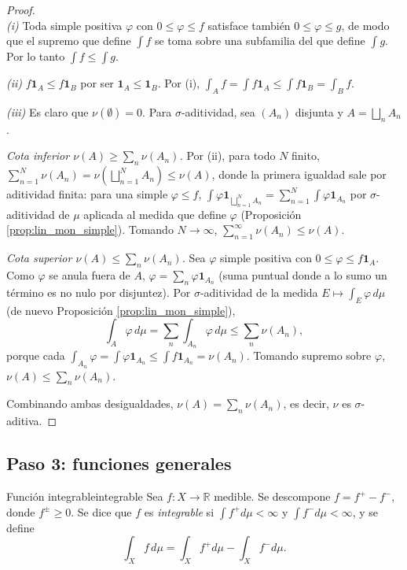 \documentclass[11pt, a4paper]{article}
\begin{document}
\begin{proof}\leavevmode\\
\textit{(i)} Toda simple positiva $\varphi$ con $0 \le \varphi \le f$ satisface también
$0 \le \varphi \le g$, de modo que el supremo que define $\int f$ se toma sobre una subfamilia del que
define $\int g$. Por lo tanto $\int f \le \int g$.

\textit{(ii)} $f \mathbf{1}_A \le f \mathbf{1}_B$ por ser $\mathbf{1}_A \le \mathbf{1}_B$. Por (i),
$\int_A f = \int f \mathbf{1}_A \le \int f \mathbf{1}_B = \int_B f$.

\textit{(iii)} Es claro que $\nu(\emptyset) = 0$. Para $\sigma$-aditividad, sea $(A_n)$ disjunta y
$A = \bigsqcup_n A_n$.

\emph{Cota inferior $\nu(A) \ge \sum_n \nu(A_n)$.} Por (ii), para todo $N$ finito,
$\sum_{n=1}^N \nu(A_n) = \nu\!\left(\bigsqcup_{n=1}^N A_n\right) \le \nu(A)$, donde la primera
igualdad sale por aditividad finita: para una simple $\varphi \le f$, $\int \varphi
\mathbf{1}_{\bigsqcup_{n=1}^N A_n} = \sum_{n=1}^N \int \varphi \mathbf{1}_{A_n}$ por
$\sigma$-aditividad de $\mu$ aplicada al medida que define $\varphi$ (Proposición
\ref{prop:lin_mon_simple}). Tomando $N \to \infty$, $\sum_{n=1}^\infty \nu(A_n) \le \nu(A)$.

\emph{Cota superior $\nu(A) \le \sum_n \nu(A_n)$.} Sea $\varphi$ simple positiva con
$0 \le \varphi \le f \mathbf{1}_A$. Como $\varphi$ se anula fuera de $A$, $\varphi = \sum_n \varphi
\mathbf{1}_{A_n}$ (suma puntual donde a lo sumo un término es no nulo por disjuntez). Por
$\sigma$-aditividad de la medida $E \mapsto \int_E \varphi \, d\mu$ (de nuevo Proposición
\ref{prop:lin_mon_simple}),
$$ \int_A \varphi \, d\mu = \sum_n \int_{A_n} \varphi \, d\mu \le \sum_n \nu(A_n), $$
porque cada $\int_{A_n} \varphi = \int \varphi \mathbf{1}_{A_n} \le \int f \mathbf{1}_{A_n} =
\nu(A_n)$. Tomando supremo sobre $\varphi$, $\nu(A) \le \sum_n \nu(A_n)$.

Combinando ambas desigualdades, $\nu(A) = \sum_n \nu(A_n)$, es decir, $\nu$ es $\sigma$-aditiva.
\end{proof}

\subsection{Paso 3: funciones generales}

\begin{definicion}{Función integrable}{integrable}
Sea $f: X \to \mathbb{R}$ medible. Se descompone $f = f^+ - f^-$, donde $f^\pm \ge 0$. Se dice que
$f$ es \emph{integrable} si $\int f^+ d\mu < \infty$ y $\int f^- d\mu < \infty$, y se define
$$ \int_X f \, d\mu = \int_X f^+ d\mu - \int_X f^- d\mu. $$
\end{definicion}
\end{document}
